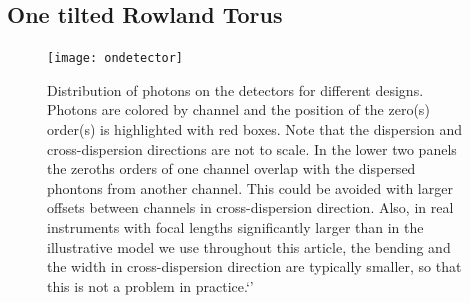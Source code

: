 \documentclass[linenumbers]{aastex631}
\begin{document}
\subsection{One tilted Rowland Torus}


\begin{figure}
    \centering
    \texttt{[image: ondetector]}
    \caption{Distribution of photons on the detectors for different designs. Photons are colored by channel and the position of the zero(s) order(s) is highlighted with red boxes. Note that the dispersion and cross-dispersion directions are not to scale. In the lower two panels the zeroths orders of one channel overlap with the dispersed phontons from another channel. This could be avoided with larger offsets between channels in cross-dispersion direction. Also, in real instruments with focal lengths significantly larger than in the illustrative model we use throughout this article, the bending and the width in cross-dispersion direction are typically smaller, so that this is not a problem in practice.`'
        }
    \label{fig:fish}
\end{figure}
\end{document}
